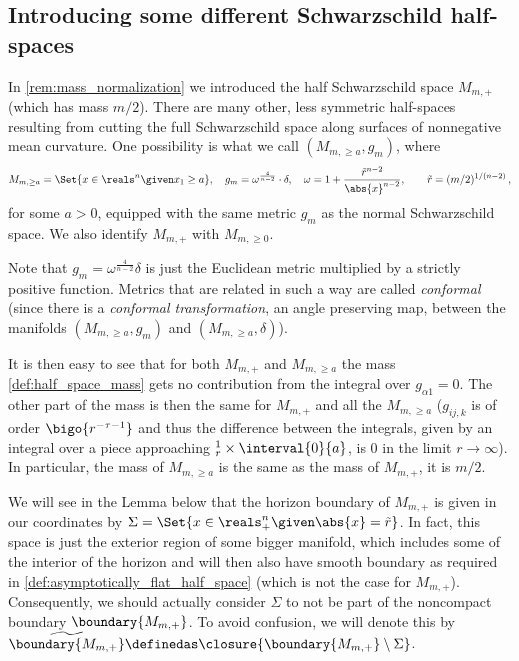 \documentclass[titlepage,numbers=noenddot,oneside,%
cleardoublepage=empty,paper=a4,fontsize=11pt,%
english,%
]{scrartcl}
\newcommand*{\mathcomma}{\,,}
\let\sphere\relax
\newcommand{\sphere}{\mathbb{S}}
\begin{document}
\subsection{Introducing some different Schwarzschild half-spaces}
In \cref{rem:mass_normalization} we introduced the half Schwarzschild space \( M_{m,+} \) (which has mass \( m/2 \)). There are many other, less symmetric half-spaces resulting from cutting the full Schwarzschild space along surfaces of nonnegative mean curvature. One possibility is what we call \( (M_{m,\geq a},g_m) \), where
\begin{equation*}
    M_{m,\geq a}=\Set{x\in \reals^n\given x_1\geq a},\quad g_m=\omega^{\frac{4}{n-2}}\cdot \delta,\quad \omega=1+\frac{\tilde{r}^{n-2}}{\abs{x}^{n-2}},\qquad \tilde{r}=(m/2)^{1/(n-2)}\mathcomma
\end{equation*}
for some \( a>0 \), equipped with the same metric \( g_m \) as the normal Schwarzschild space. We also identify \( M_{m,+} \) with \( M_{m,\geq 0} \). 


Note that \( g_m=\omega^{\frac{4}{n-2}} \delta \) is just the Euclidean metric multiplied by a strictly positive function. Metrics that are related in such a way are called \emph{conformal} (since there is a \emph{conformal transformation}, \ie an angle preserving map, between the manifolds \( (M_{m,\geq a},g_m) \) and \( (M_{m,\geq a},\delta) \)).

It is then easy to see that for both \( M_{m,+} \) and \( M_{m,\geq a} \) the mass \cref{def:half_space_mass} gets no contribution from the integral over \( g_{\alpha 1}=0 \). The other part of the mass is then the same for \( M_{m,+} \) and all the \( M_{m,\geq a} \) (\( g_{ij,k} \) is of order \( \bigo{r^{-\tau-1}} \) and thus the difference between the integrals, given by an integral over a piece approaching \( \sphere^1_r\times \interval{0}{a} \), is \( 0 \) in the limit \( r\to \infty \)). In particular, the mass of \( M_{m,\geq a} \) is the same as the mass of \( M_{m,+} \), \ie it is \( m/2 \).


\newcommand{\schwarzschildboundary}{\widetilde{\boundary{M_{m,+}}}}
\newcommand{\modifiedschwarzschildboundary}{\boundary{M_{m,\geq a}}}


We will see in the Lemma below that the horizon boundary of \( M_{m,+} \) is given in our coordinates by \( \Sigma=\Set{x\in \reals^n_+\given \abs{x}=\tilde{r}} \). In fact, this space is just the exterior region of some bigger manifold, which includes some of the interior of the horizon and will then also have smooth boundary as required in \cref{def:asymptotically_flat_half_space} (which is not the case for \( M_{m,+} \)). Consequently, we should actually consider \( \Sigma \) to not be part of the noncompact boundary \( \boundary{M_{m,+}} \). To avoid confusion, we will denote this by \( \schwarzschildboundary\definedas \closure{\boundary{M_{m,+}}\setminus \Sigma} \).
\end{document}
